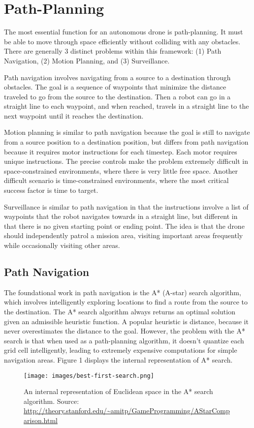 \section{Path-Planning}
The most essential function for an autonomous drone is path-planning. It must be able to move through space efficiently without colliding with any obstacles. There are generally 3 distinct problems within this framework: (1) Path Navigation, (2) Motion Planning, and (3) Surveillance.

Path navigation involves navigating from a source to a destination through obstacles. The goal is a sequence of waypoints that minimize the distance traveled to go from the source to the destination. Then a robot can go in a straight line to each waypoint, and when reached, travels in a straight line to the next waypoint until it reaches the destination.

Motion planning is similar to path navigation because the goal is still to navigate from a source position to a destination position, but differs from path navigation because it requires motor instructions for each timestep. Each motor requires unique instructions. The precise controls make the problem extremely difficult in space-constrained environments, where there is very little free space. Another difficult scenario is time-constrained environments, where the most critical success factor is time to target.

Surveillance is similar to path navigation in that the instructions involve a list of waypoints that the robot navigates towards in a straight line, but different in that there is no given starting point or ending point. The idea is that the drone should independently patrol a mission area, visiting important areas frequently while occasionally visiting other areas.

\subsection{Path Navigation}
The foundational work in path navigation is the A* (A-star) search algorithm, which involves intelligently exploring locations to find a route from the source to the destination. \cite{hart1968formal} The A* search algorithm always returns an optimal solution given an admissible heuristic function. A popular heuristic is distance, because it never overestimates the distance to the goal. However, the problem with the A* search is that when used as a path-planning algorithm, it doesn't quantize each grid cell intelligently, leading to extremely expensive computations for simple navigation areas. Figure 1 displays the internal representation of A* search.
\begin{figure}[h]
    \centering
    \texttt{[image: images/best-first-search.png]}
    \caption{An internal representation of Euclidean space in the A* search algorithm. Source: \url{http://theory.stanford.edu/~amitp/GameProgramming/AStarComparison.html}}
    \label{fig:astar}
\end{figure}

